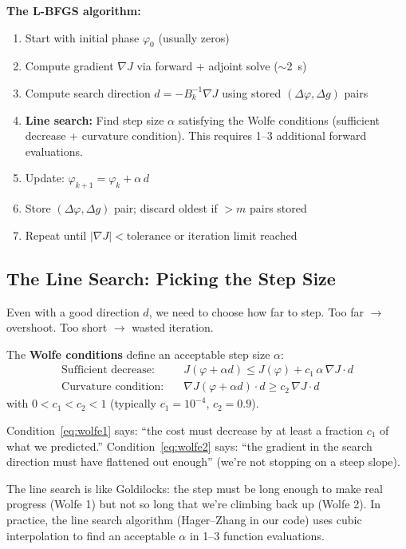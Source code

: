 \documentclass[12pt,a4paper]{article}
\begin{document}
\begin{keyeq}
\textbf{The L-BFGS algorithm:}
\begin{enumerate}[leftmargin=*]
    \item Start with initial phase $\varphi_0$ (usually zeros)
    \item Compute gradient $\nabla J$ via forward + adjoint solve ($\sim$2~s)
    \item Compute search direction $d = -B_k^{-1}\nabla J$ using stored $(\Delta\varphi, \Delta g)$ pairs
    \item \textbf{Line search:} Find step size $\alpha$ satisfying the Wolfe conditions (sufficient decrease + curvature condition). This requires 1--3 additional forward evaluations.
    \item Update: $\varphi_{k+1} = \varphi_k + \alpha\,d$
    \item Store $(\Delta\varphi, \Delta g)$ pair; discard oldest if $> m$ pairs stored
    \item Repeat until $|\nabla J| < \text{tolerance}$ or iteration limit reached
\end{enumerate}
\end{keyeq}

\subsection{The Line Search: Picking the Step Size}

Even with a good direction $d$, we need to choose how far to step. Too far $\to$ overshoot. Too short $\to$ wasted iteration.

The \textbf{Wolfe conditions} define an acceptable step size $\alpha$:
\begin{align}
\text{Sufficient decrease:} \quad & J(\varphi + \alpha d) \leq J(\varphi) + c_1\,\alpha\,\nabla J \cdot d \label{eq:wolfe1}\\
\text{Curvature condition:} \quad & \nabla J(\varphi + \alpha d)\cdot d \geq c_2\,\nabla J \cdot d \label{eq:wolfe2}
\end{align}
with $0 < c_1 < c_2 < 1$ (typically $c_1 = 10^{-4}$, $c_2 = 0.9$).

Condition~\eqref{eq:wolfe1} says: ``the cost must decrease by at least a fraction $c_1$ of what we predicted.'' Condition~\eqref{eq:wolfe2} says: ``the gradient in the search direction must have flattened out enough'' (we're not stopping on a steep slope).

\begin{intuition}
The line search is like Goldilocks: the step must be long enough to make real progress (Wolfe 1) but not so long that we're climbing back up (Wolfe 2). In practice, the line search algorithm (Hager--Zhang in our code) uses cubic interpolation to find an acceptable $\alpha$ in 1--3 function evaluations.
\end{intuition}
\end{document}
